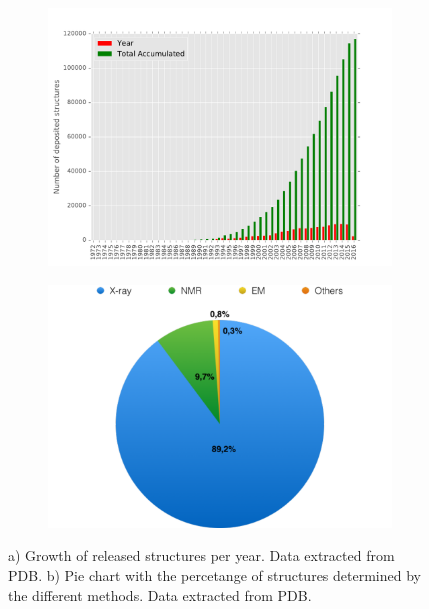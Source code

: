 \documentclass[12pt, a4paper,twoside]{tesi_upf}
\begin{document}
\begin{figure}[!tbp]
  
  \centering
    \begin{subfigure}[b]{0.75\textwidth}
	\includegraphics[width=1\linewidth]{../figures/pdbs_per_year.pdf}
	\caption{}
	\label{fig:structures_pdb}
	\end{subfigure}
	\begin{subfigure}[b]{0.55\textwidth}
	\includegraphics[width=1\linewidth]{../figures/pie_smethods.pdf}
	\caption{}
	\label{fig:smethods_pie}
	\end{subfigure}
   \caption{a) Growth of released structures per year. Data extracted from PDB. b) Pie chart with the percetange of structures determined by the different methods. Data extracted from PDB.}
   
	
	
\end{figure}
\end{document}
